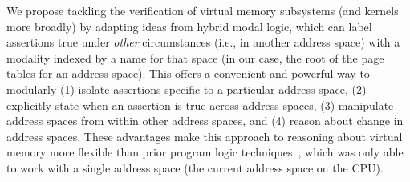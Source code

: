 We propose tackling the verification of virtual memory subsystems (and kernels more broadly) by adapting ideas from hybrid modal logic, which can label assertions true under \emph{other} circumstances (i.e., in another address space) with a modality indexed by a name for that space (in our case, the root of the page tables for an address space). This offers a convenient and powerful way to modularly (1) isolate assertions specific to a particular address space, (2) explicitly state when an assertion is true across address spaces, (3) manipulate address spaces from within other address spaces, and (4) reason about change in address spaces. These advantages make this approach to reasoning about virtual memory more flexible than prior program logic techniques~\cite{kolanski08vstte,kolanski09tphols}, which was only able to work with a single address space (the current address space on the CPU).

